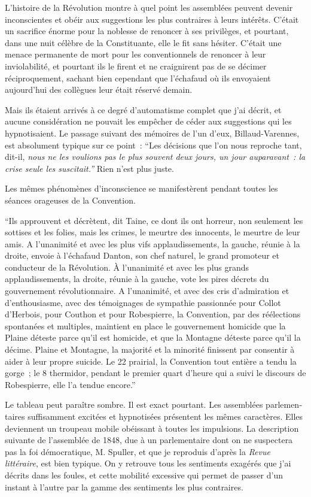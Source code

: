 \documentclass[french,twoside]{book} %
\begin{document}
L’histoire de la Révolution montre à quel point les assemblées peuvent devenir inconscientes et obéir aux suggestions les plus contraires à leurs intérêts. C’était un sacrifice énorme pour la noblesse de renoncer à ses privilèges, et pourtant, dans une nuit célèbre de la Constituante, elle le fit sans hésiter. C’était une menace permanente de mort pour les conventionnels de renoncer à leur inviolabilité, et pourtant ils le firent et ne craignirent pas de se décimer réciproquement, sachant bien cependant que l’échafaud où ils envoyaient aujourd’hui des collègues leur était réservé demain.\par
Mais ils étaient arrivés à ce degré d’automatisme complet que j’ai décrit, et aucune considération ne pouvait les empêcher de céder aux suggestions qui les hypnotisaient. Le passage suivant des mémoires de l’un d’eux, Billaud-Varennes, est absolument typique sur ce point : “Les décisions que l’on nous reproche tant, dit-il, \emph{nous ne les voulions pas le plus souvent deux jours, un jour auparavant : la crise seule les suscitait.”} Rien n’est plus juste.\par
Les mêmes phénomènes d’inconscience se manifestèrent pendant toutes les séances orageuses de la Convention.\par
“Ils approuvent et décrètent, dit Taine, ce dont ils ont horreur, non seulement les sottises et les folies, mais les crimes, le meurtre des innocents, le meurtre de leur amis. A l’unanimité et avec les plus vifs applaudissements, la gauche, réunie à la droite, envoie à l’échafaud Danton, son chef naturel, le grand promoteur et conducteur de la Révolution. À l’unanimité et avec les plus grands applaudissements, la droite, réunie à la gauche, vote les pires décrets du gouvernement révolutionnaire. A l’unani­mité, et avec des cris d’admiration et d’enthousiasme, avec des témoignages de sympathie passionnée pour Collot d’Herbois, pour Couthon et pour Robespierre, la Convention, par des réélections spontanées et multiples, maintient en place le gouvernement homicide que la Plaine déteste parce qu’il est homicide, et que la Mon­tagne déteste parce qu’il la décime. Plaine et Montagne, la majorité et la minorité finissent par consentir à aider à leur propre suicide. Le 22 prairial, la Convention tout entière a tendu la gorge ; le 8 thermidor, pendant le premier quart d’heure qui a suivi le discours de Robes­pierre, elle l’a tendue encore.”\par
Le tableau peut paraître sombre. Il est exact pourtant. Les assemblées parlemen­taires suffisamment excitées et hypnotisées présentent les mêmes caractères. Elles deviennent un troupeau mobile obéissant à toutes les impulsions. La description suivante de l’assemblée de 1848, due à un parlementaire dont on ne suspectera pas la foi démocratique, M. Spuller, et que je reproduis d’après la \emph{Revue littéraire}, est bien typique. On y retrouve tous les sentiments exagérés que j’ai décrits dans les foules, et cette mobilité excessive qui permet de passer d’un instant à l’autre par la gamme des sentiments les plus contraires.\par
\end{document}
